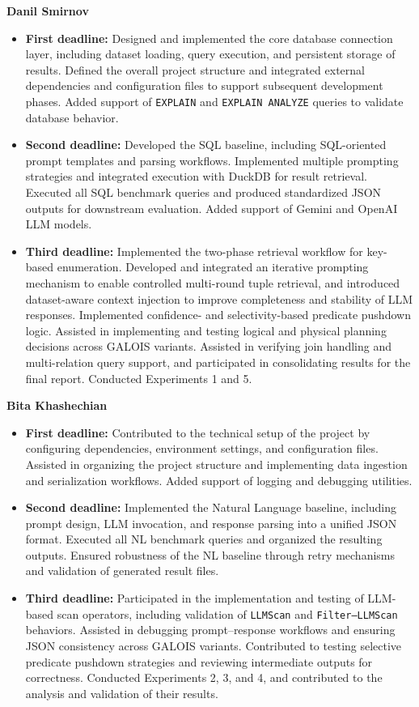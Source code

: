 \documentclass[11pt]{article}
\begin{document}
\noindent\textbf{Danil Smirnov}
\begin{itemize}
  \item \textbf{First deadline:} Designed and implemented the core database connection layer, including dataset loading, query execution, and persistent storage of results. Defined the overall project structure and integrated external dependencies and configuration files to support subsequent development phases. Added support of \texttt{EXPLAIN} and \texttt{EXPLAIN ANALYZE} queries to validate database behavior.
  \item \textbf{Second deadline:} Developed the SQL baseline, including SQL-oriented prompt templates and parsing workflows. Implemented multiple prompting strategies and integrated execution with DuckDB for result retrieval. Executed all SQL benchmark queries and produced standardized JSON outputs for downstream evaluation. Added support of Gemini and OpenAI LLM models.
  \item \textbf{Third deadline:} Implemented the two-phase retrieval workflow for key-based enumeration. Developed and integrated an iterative prompting mechanism to enable controlled multi-round tuple retrieval, and introduced dataset-aware context injection to improve completeness and stability of LLM responses. Implemented confidence- and selectivity-based predicate pushdown logic. Assisted in implementing and testing logical and physical planning decisions across GALOIS variants. Assisted in verifying join handling and multi-relation query support, and participated in consolidating results for the final report. Conducted Experiments 1 and 5. 
\end{itemize}

\noindent\textbf{Bita Khashechian}
\begin{itemize}
  \item \textbf{First deadline:} Contributed to the technical setup of the project by configuring dependencies, environment settings, and configuration files. Assisted in organizing the project structure and implementing data ingestion and serialization workflows. Added support of logging and debugging utilities.
  \item \textbf{Second deadline:} Implemented the Natural Language baseline, including prompt design, LLM invocation, and response parsing into a unified JSON format. Executed all NL benchmark queries and organized the resulting outputs. Ensured robustness of the NL baseline through retry mechanisms and validation of generated result files.
  \item \textbf{Third deadline:} Participated in the implementation and testing of LLM-based scan operators, including validation of \texttt{LLMScan} and \texttt{Filter--LLMScan} behaviors. Assisted in debugging prompt--response workflows and ensuring JSON consistency across GALOIS variants. Contributed to testing selective predicate pushdown strategies and reviewing intermediate outputs for correctness. Conducted Experiments 2, 3, and 4, and contributed to the analysis and validation of their results.
\end{itemize}
\end{document}
